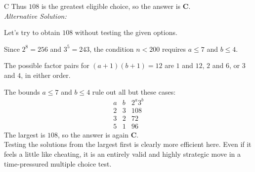 \documentclass[11pt,a4paper]{article}
\begin{document}
\begin{enumerate}[label=\textbf{\arabic*.},leftmargin=*,itemsep=0pt,start=5]
\begin{djsSolution}{C}
Thus $108$ is the greatest eligible choice, so the answer is \textbf{C}.\\[5pt]

\textit{Alternative Solution:}

Let's try to obtain $108$ without testing the given options.

Since $2^8=256$ and $3^5=243$, the condition $n<200$ requires $a\leq7$ and $b\leq4$. 

The possible factor pairs for $(a+1)(b+1)=12$ are $1$ and $12$, $2$ and $6$, or $3$ and $4$, in either order. 

The bounds $a\leq7$ and $b\leq4$ rule out all but these cases:
\[\begin{array}{c|c|c}
a&b&2^a3^b\\ \hline
2&3&108\\
3&2&72\\
5&1&96
\end{array}\]
The largest is $108$, so the answer is again \textbf{C}. \\

Testing the solutions from the largest first is clearly more efficient here. Even if it feels a little like cheating, it is an entirely valid and highly strategic move in a time-pressured multiple choice test.
\end{djsSolution}
\end{enumerate}
\clearpage
\thispagestyle{djssolutions}
\vspace*{8pt}
\end{document}
